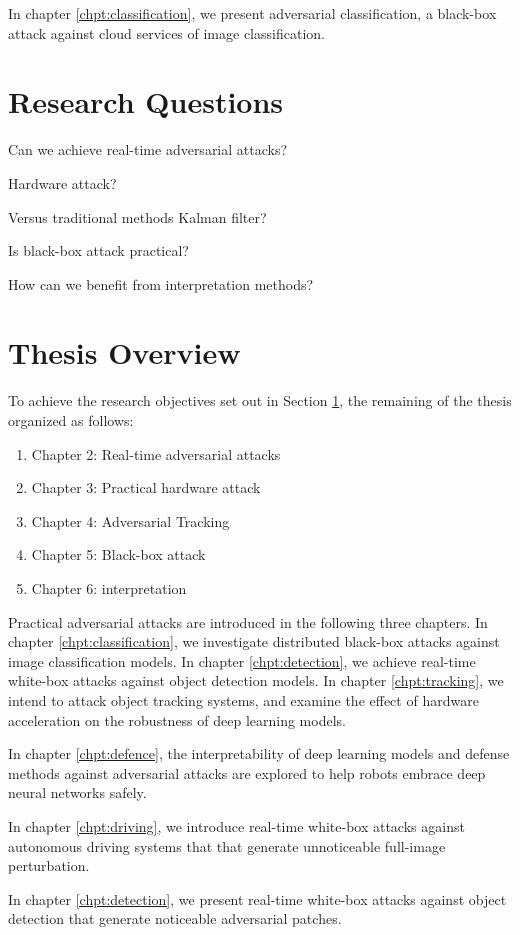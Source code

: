 In chapter \ref{chpt:classification}, we present adversarial classification, a black-box attack against cloud services of image classification.

\clearpage

\section{Research Questions}
\label{sec:research_question}

Can we achieve real-time adversarial attacks?

Hardware attack?

Versus traditional methods Kalman filter?

Is black-box attack practical?

How can we benefit from interpretation methods?

\section{Thesis Overview}

To achieve the research objectives set out in Section \ref{sec:research_question}, the remaining of the thesis organized as follows:

\begin{enumerate}
    \item Chapter 2: Real-time adversarial attacks
    \item Chapter 3: Practical hardware attack
    \item Chapter 4: Adversarial Tracking
    \item Chapter 5: Black-box attack
    \item Chapter 6: interpretation
\end{enumerate}

Practical adversarial attacks are introduced in the following three chapters. In chapter \ref{chpt:classification}, we investigate distributed black-box attacks against image classification models. In chapter \ref{chpt:detection}, we achieve real-time white-box attacks against object detection models. In chapter \ref{chpt:tracking}, we intend to attack object tracking systems, and examine the effect of hardware acceleration on the robustness of deep learning models. 


In chapter \ref{chpt:defence}, the interpretability of deep learning models and defense methods against adversarial attacks are explored to help robots embrace deep neural networks safely.

In chapter \ref{chpt:driving}, we introduce real-time white-box attacks against autonomous driving systems that that generate unnoticeable full-image perturbation.

In chapter \ref{chpt:detection}, we present real-time white-box attacks against object detection that generate noticeable adversarial patches.